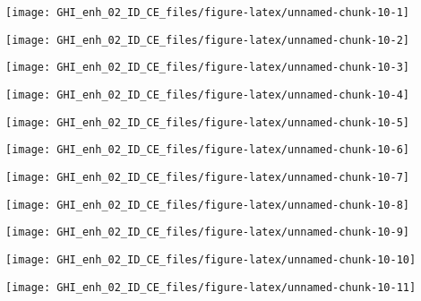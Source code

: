 \documentclass[
  10pt,
  a4paper,oneside]{article}
\begin{document}
\begin{center}\texttt{[image: GHI\_enh\_02\_ID\_CE\_files/figure-latex/unnamed-chunk-10-1]} \end{center}

\begin{center}\texttt{[image: GHI\_enh\_02\_ID\_CE\_files/figure-latex/unnamed-chunk-10-2]} \end{center}

\begin{center}\texttt{[image: GHI\_enh\_02\_ID\_CE\_files/figure-latex/unnamed-chunk-10-3]} \end{center}

\begin{center}\texttt{[image: GHI\_enh\_02\_ID\_CE\_files/figure-latex/unnamed-chunk-10-4]} \end{center}

\begin{center}\texttt{[image: GHI\_enh\_02\_ID\_CE\_files/figure-latex/unnamed-chunk-10-5]} \end{center}

\begin{center}\texttt{[image: GHI\_enh\_02\_ID\_CE\_files/figure-latex/unnamed-chunk-10-6]} \end{center}

\begin{center}\texttt{[image: GHI\_enh\_02\_ID\_CE\_files/figure-latex/unnamed-chunk-10-7]} \end{center}

\begin{center}\texttt{[image: GHI\_enh\_02\_ID\_CE\_files/figure-latex/unnamed-chunk-10-8]} \end{center}

\begin{center}\texttt{[image: GHI\_enh\_02\_ID\_CE\_files/figure-latex/unnamed-chunk-10-9]} \end{center}

\begin{center}\texttt{[image: GHI\_enh\_02\_ID\_CE\_files/figure-latex/unnamed-chunk-10-10]} \end{center}

\begin{center}\texttt{[image: GHI\_enh\_02\_ID\_CE\_files/figure-latex/unnamed-chunk-10-11]} \end{center}
\end{document}
